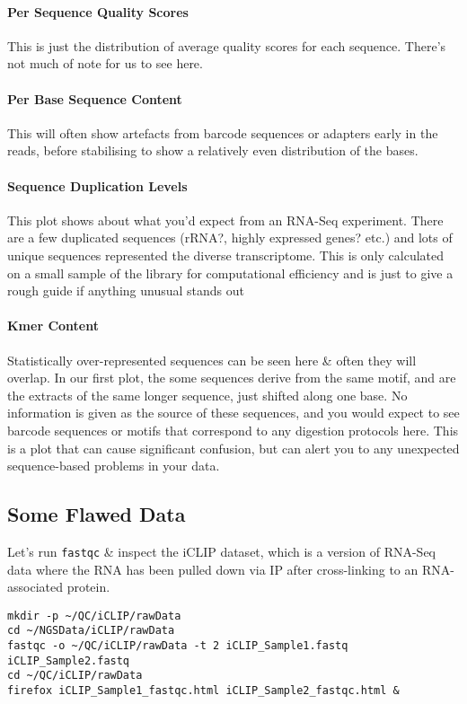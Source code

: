 \paragraph*{Per Sequence Quality Scores}
This is just the distribution of average quality scores for each sequence.
There's not much of note for us to see here.

\paragraph{Per Base Sequence Content}
This will often show artefacts from barcode sequences or adapters early in the reads, before stabilising to show a relatively even distribution of the bases.

\paragraph{Sequence Duplication Levels}
This plot shows about what you'd expect from an RNA-Seq experiment.
There are a few duplicated sequences (rRNA?, highly expressed genes? etc.) and lots of unique sequences represented the diverse transcriptome.
This is only calculated on a small sample of the library for computational efficiency and is just to give a rough guide if anything unusual stands out

\paragraph{Kmer Content}
Statistically over-represented sequences can be seen here \& often they will overlap. 
In our first plot, the some sequences derive from the same motif, and are the extracts of the same longer sequence, just shifted along one base.
No information is given as the source of these sequences, and you would expect to see barcode sequences or motifs that correspond to any digestion protocols here.
This is a plot that can cause significant confusion, but can alert you to any unexpected sequence-based problems in your data.

\subsection{Some Flawed Data}
Let's run \texttt{fastqc} \& inspect the iCLIP dataset, which is a version of RNA-Seq data where the RNA has been pulled down via IP after cross-linking to an RNA-associated protein.

\begin{lstlisting}
mkdir -p ~/QC/iCLIP/rawData
cd ~/NGSData/iCLIP/rawData
fastqc -o ~/QC/iCLIP/rawData -t 2 iCLIP_Sample1.fastq iCLIP_Sample2.fastq
cd ~/QC/iCLIP/rawData
firefox iCLIP_Sample1_fastqc.html iCLIP_Sample2_fastqc.html &
\end{lstlisting}

